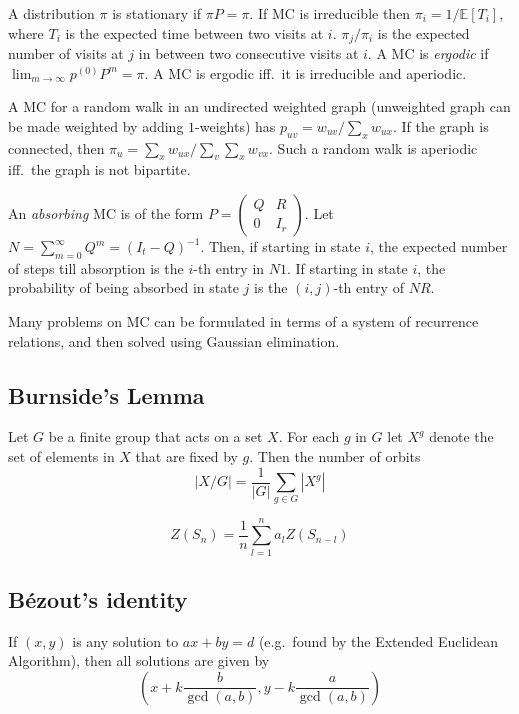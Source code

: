 \documentclass[8pt,a4paper,landscape,oneside]{amsart}
\begin{document}
\begin{multicols*}{3}
            A distribution $\pi$ is stationary if $\pi P = \pi$. If MC is
            irreducible then $\pi_i = 1/\mathbb{E}[T_i]$, where $T_i$ is the
            expected time between two visits at $i$. $\pi_j/\pi_i$ is the expected
            number of visits at $j$ in between two consecutive visits at $i$. A MC
            is \textit{ergodic} if $\lim_{m\to\infty} p^{(0)} P^{m} = \pi$. A MC is
            ergodic iff.\ it is irreducible and aperiodic.

            A MC for a random walk in an undirected weighted graph (unweighted
            graph can be made weighted by adding $1$-weights) has $p_{uv} =
            w_{uv}/\sum_{x} w_{ux}$. If the graph is connected, then $\pi_u =
            \sum_{x} w_{ux} / \sum_{v}\sum_{x} w_{vx}$. Such a random walk is
            aperiodic iff.\ the graph is not bipartite.

            An \textit{absorbing} MC is of the form $P = \left(\begin{matrix} Q & R
            \\ 0 & I_r \end{matrix}\right)$. Let $N = \sum_{m=0}^\infty Q^m = (I_t
            - Q)^{-1}$. Then, if starting in state $i$, the expected number of
            steps till absorption is the $i$-th entry in $N1$. If starting in state
            $i$, the probability of being absorbed in state $j$ is the $(i,j)$-th
            entry of $NR$.

            Many problems on MC can be formulated in terms of a system of
            recurrence relations, and then solved using Gaussian elimination.

        \subsection{Burnside's Lemma}
            Let $G$ be a finite group that acts on a set $X$. For each $g$ in $G$
            let $X^g$ denote the set of elements in $X$ that are fixed by $g$. Then
            the number of orbits \[ |X/G| = \frac{1}{|G|} \sum_{g\in G} |X^g| \]

            \[
                Z(S_n) = \frac{1}{n} \sum_{l=1}^n a_l Z(S_{n-l})
            \]

        \subsection{Bézout's identity}
            If $(x,y)$ is any solution to $ax+by=d$ (e.g.\ found by the Extended
            Euclidean Algorithm), then all solutions are given by \[
            \left(x+k\frac{b}{\gcd(a,b)}, y-k\frac{a}{\gcd(a,b)}\right) \]


\end{multicols*}
\end{document}
